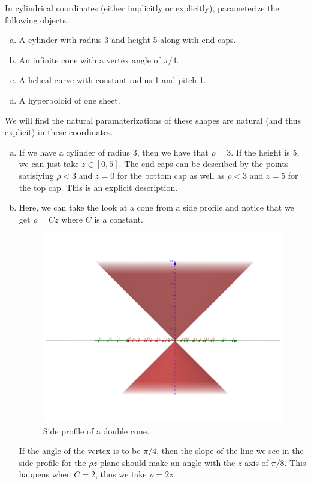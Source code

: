 \documentclass[12pt]{article} %
\begin{document}
\newpage
\begin{problem}
	In cylindrical coordinates (either implicitly or explicitly), parameterize the following objects.
	\begin{enumerate}[(a)]
		\item A cylinder with radius 3 and height 5 along with end-caps.
		\item An infinite cone with a vertex angle of $\pi/4$.
		\item A helical curve with constant radius 1 and pitch 1.
		\item A hyperboloid of one sheet.
	\end{enumerate}
\end{problem}
\begin{solution} We will find the natural paramaterizations of these shapes are natural (and thus explicit) in these coordinates.
    \begin{enumerate}[(a)]
        \item If we have a cylinder of radius 3, then we have that $\rho=3$.  If the height is $5$, we can just take $z\in [0,5]$.  The end caps can be described by the points satisfying $\rho<3$ and $z=0$ for the bottom cap as well as $\rho<3$ and $z=5$ for the top cap. This is an explicit description.
        \item Here, we can take the look at a cone from a side profile and notice that we get $\rho=Cz$ where $C$ is a constant.  
        \begin{figure}[H]
            \centering
            \includegraphics[width=.6\columnwidth]{cone_side.png}
            \caption{Side profile of a double cone.}
        \end{figure}
        If the angle of the vertex is to be $\pi/4$, then the slope of the line we see in the side profile for the $\rho z$-plane should make an angle with the $z$-axis of $\pi/8$. This happens when $C=2$, thus we take $\rho=2z$.
        

\end{enumerate}
\end{solution}
\end{document}
